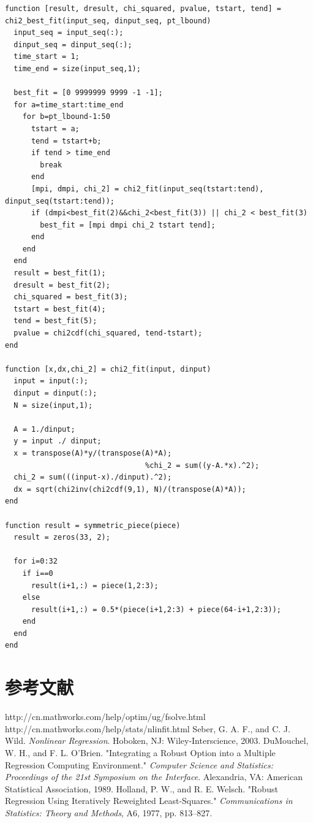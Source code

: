 \documentclass[paper=a4, fontsize=11pt]{scrartcl} %
\numberwithin{equation}{section} %
\numberwithin{figure}{section} %
\numberwithin{table}{section} %
\begin{document}
\begin{CJK*}{UTF8}{gbsn}
\begin{lstlisting}
function [result, dresult, chi_squared, pvalue, tstart, tend] = chi2_best_fit(input_seq, dinput_seq, pt_lbound)
  input_seq = input_seq(:);
  dinput_seq = dinput_seq(:);
  time_start = 1;
  time_end = size(input_seq,1);

  best_fit = [0 9999999 9999 -1 -1];
  for a=time_start:time_end
    for b=pt_lbound-1:50
      tstart = a;
      tend = tstart+b;
      if tend > time_end
        break
      end
      [mpi, dmpi, chi_2] = chi2_fit(input_seq(tstart:tend), dinput_seq(tstart:tend));
      if (dmpi<best_fit(2)&&chi_2<best_fit(3)) || chi_2 < best_fit(3)
        best_fit = [mpi dmpi chi_2 tstart tend];
      end
    end
  end
  result = best_fit(1);
  dresult = best_fit(2);
  chi_squared = best_fit(3);
  tstart = best_fit(4);
  tend = best_fit(5);
  pvalue = chi2cdf(chi_squared, tend-tstart);
end

function [x,dx,chi_2] = chi2_fit(input, dinput)
  input = input(:);
  dinput = dinput(:);
  N = size(input,1);

  A = 1./dinput;
  y = input ./ dinput;
  x = transpose(A)*y/(transpose(A)*A);
                                %chi_2 = sum((y-A.*x).^2);
  chi_2 = sum(((input-x)./dinput).^2);
  dx = sqrt(chi2inv(chi2cdf(9,1), N)/(transpose(A)*A));
end

function result = symmetric_piece(piece)
  result = zeros(33, 2);

  for i=0:32
    if i==0
      result(i+1,:) = piece(1,2:3);
    else
      result(i+1,:) = 0.5*(piece(i+1,2:3) + piece(64-i+1,2:3));
    end
  end
end

\end{lstlisting}

\section{参考文献}
\begin{thebibliography}{9}
http://cn.mathworks.com/help/optim/ug/fsolve.html
http://cn.mathworks.com/help/stats/nlinfit.html
 Seber, G. A. F., and C. J. Wild. \emph{Nonlinear Regression}. Hoboken, NJ: Wiley-Interscience, 2003.
 DuMouchel, W. H., and F. L. O'Brien. "Integrating a Robust Option into a Multiple Regression Computing Environment." \emph{Computer Science and Statistics: Proceedings of the 21st Symposium on the Interface}. Alexandria, VA: American Statistical Association, 1989.
 Holland, P. W., and R. E. Welsch. "Robust Regression Using Iteratively Reweighted Least-Squares." \emph{Communications in Statistics: Theory and Methods}, A6, 1977, pp. 813–827.
 
 \end{thebibliography}
\end{CJK*}
\end{document}
